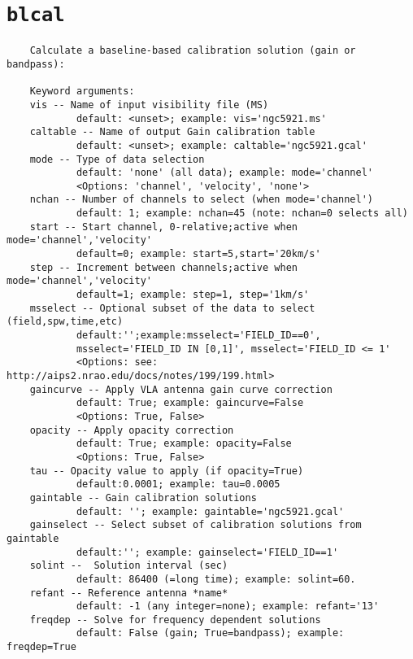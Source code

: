 \section{{\tt blcal}}
\label{section:tasks.blcal}

\small
\begin{verbatim}
    Calculate a baseline-based calibration solution (gain or bandpass):
    
    Keyword arguments:
    vis -- Name of input visibility file (MS)
            default: <unset>; example: vis='ngc5921.ms'
    caltable -- Name of output Gain calibration table
            default: <unset>; example: caltable='ngc5921.gcal'
    mode -- Type of data selection
            default: 'none' (all data); example: mode='channel'
            <Options: 'channel', 'velocity', 'none'>
    nchan -- Number of channels to select (when mode='channel')
            default: 1; example: nchan=45 (note: nchan=0 selects all)
    start -- Start channel, 0-relative;active when mode='channel','velocity'
            default=0; example: start=5,start='20km/s'
    step -- Increment between channels;active when mode='channel','velocity'
            default=1; example: step=1, step='1km/s'
    msselect -- Optional subset of the data to select (field,spw,time,etc)
            default:'';example:msselect='FIELD_ID==0', 
            msselect='FIELD_ID IN [0,1]', msselect='FIELD_ID <= 1'
            <Options: see: http://aips2.nrao.edu/docs/notes/199/199.html>
    gaincurve -- Apply VLA antenna gain curve correction
            default: True; example: gaincurve=False
            <Options: True, False>
    opacity -- Apply opacity correction
            default: True; example: opacity=False
            <Options: True, False>
    tau -- Opacity value to apply (if opacity=True)
            default:0.0001; example: tau=0.0005
    gaintable -- Gain calibration solutions
            default: ''; example: gaintable='ngc5921.gcal'
    gainselect -- Select subset of calibration solutions from gaintable
            default:''; example: gainselect='FIELD_ID==1'
    solint --  Solution interval (sec)
            default: 86400 (=long time); example: solint=60.
    refant -- Reference antenna *name*
            default: -1 (any integer=none); example: refant='13'
    freqdep -- Solve for frequency dependent solutions
            default: False (gain; True=bandpass); example: freqdep=True
\end{verbatim}
\normalsize


